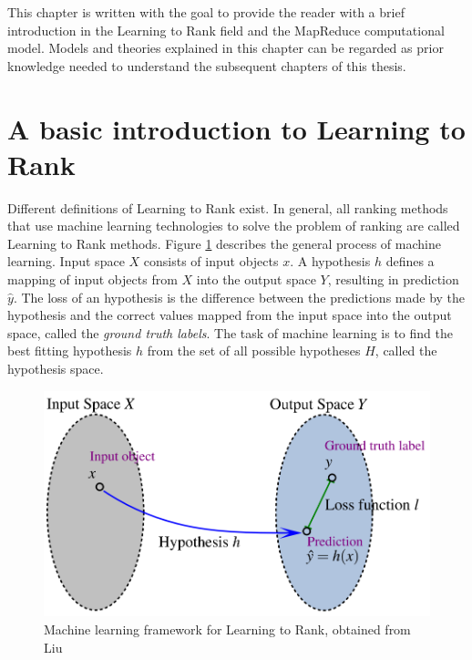This chapter is written with the goal to provide the reader with a brief introduction in the Learning to Rank field and the MapReduce computational model. Models and theories explained in this chapter can be regarded as prior knowledge needed to understand the subsequent chapters of this thesis.
\section{A basic introduction to Learning to Rank}
Different definitions of Learning to Rank exist. In general, all ranking methods that use machine learning technologies to solve the problem of ranking are called Learning to Rank methods. Figure \ref{fig:discriminative_training} describes the general process of machine learning. Input space $X$ consists of input objects $x$. A hypothesis $h$ defines a mapping of input objects from $X$ into the output space $Y$, resulting in prediction $\hat{y}$. The loss of an hypothesis is the difference between the predictions made by the hypothesis and the correct values mapped from the input space into the output space, called the \emph{ground truth labels}. The task of machine learning is to find the best fitting hypothesis $h$ from the set of all possible hypotheses $H$, called the hypothesis space.\\

\begin{figure}[!h]
\includegraphics[scale=0.26]{gfx/descriminative_training}
\caption{Machine learning framework for Learning to Rank, obtained from Liu \cite{Liu2007}}
\label{fig:discriminative_training}
\end{figure}

